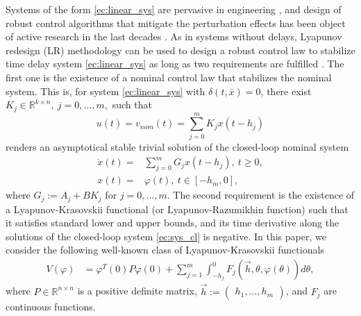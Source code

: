 \documentclass[onecolumn]{IEEEtran}
\begin{document}
Systems of the form \eqref{ec:linear_sys} are pervasive in engineering \cite{Kolmanovskii1999}, and design of robust  control algorithms  that  mitigate the  perturbation effects  has been object of active research in the last  decades { \cite{Richard2001, Han2009,Han2010, Oliveiraetal2016, Sanchezetal2020}}. As in systems without delays, Lyapunov redesign (LR) \cite{Gutman1979,Leitmann1979,Khalil1992} methodology can be used to design a robust control law to stabilize time delay system \eqref{ec:linear_sys} as long as two  requirements are fulfilled {\cite{ Thowsen1983, Wu2004, Wu2009, Rodriguez2015etal, Rodriguezetal2019}}. The first one is the existence of  a nominal control law that stabilizes the nominal system. This is, for system \eqref{ec:linear_sys} with $\delta(t, \bar x)=0$, there exist $K_j\in \mathbb{R}^{k\times n},\:j=0,\ldots,m,$ such that
\begin{equation}
\label{ec:control_nom}
u(t)=v_{nom}(t)=\sum_{j=0}^{m}K_{j}x(t-h_j)
\end{equation} renders an asymptotical stable trivial solution of the closed-loop nominal system
\begin{equation}
\label{ec:sys_cl}
\begin{split}
\dot x(t)=&\sum_{j=0}^{m}G_jx(t-h_j),\:t\geq 0,\\
x(t)=&\varphi(t),\:t\in [-h_{m},0],
\end{split}
\end{equation}
where $ G_j:=A_j+BK_{j}$ for $j=0,\ldots,m$.   The second requirement is the existence of a Lyapunov-Krasovskii functional (or Lyapunov-Razumikhin function) such that it satisfies {standard}  lower and upper bounds, and its time derivative along the solutions of the closed-loop system \eqref{ec:sys_cl} is negative. In this paper, we consider the following well-known class of Lyapunov-Krasovskii functionals   \cite{fridman2014introduction}
\begin{equation}
\begin{aligned}
\label{ec:LK_functional_gen}
V(\varphi)&=\varphi^T(0)P\varphi(0)+\sum_{j=1}^{m}\int_{-h_j}^{0}F_j\left(\vec{h},\theta,\varphi(\theta)\right) d\theta,
\end{aligned}
\end{equation}
where $P\in \mathbb{R}^{n\times n}$ is a positive definite matrix, $\vec{h}:=\begin{pmatrix}
h_1,\ldots,h_{m}
\end{pmatrix}$,  and $F_j$ are  continuous functions.
\end{document}
